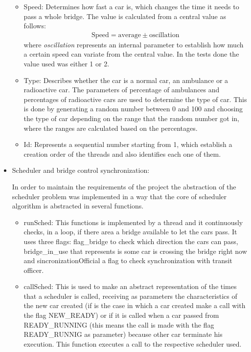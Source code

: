 \documentclass[a4paper,9pt]{article}
\begin{document}
\begin{itemize}
\begin{itemize}
\item Speed: Determines how fast a car is, which changes the time it needs to pass a whole bridge. The value is calculated from a central value as follows:
\begin{align}
\text{Speed} = \text{average} \pm \text{oscillation}
\end{align}
where \emph{oscillation} represents an internal parameter to establish how much a certain speed can variate from the central value. In the tests done the value used was either 1 or 2.

\item Type: Describes whether the car is a normal car, an ambulance or a radioactive car. The parameters of percentage of ambulances and percentages of radioactive cars are used to determine the type of car. This is done by generating a random number between 0 and 100 and choosing the type of car depending on the range that the random number got in, where the ranges are calculated based on the percentages.

\item Id: Represents a sequential number starting from 1, which establish a creation order of the threads and also identifies each one of them. 

\end{itemize}

\item Scheduler and bridge control synchronization: 

In order to maintain the requirements of the project the abstraction of the scheduler problem was implemented in a way that the core of scheduler algorithm is abstracted in several functions.
\begin{itemize}
\item runSched: This functions is implemented by a thread and it continuously checks, in a loop, if there area a bridge available to let the cars pass. It uses three flags: flag\_bridge to check which direction the cars can pass, bridge\_in\_use that represents is some car is crossing the bridge right now and sincronizationOfficial a flag to check synchronization with transit officer. 

\item callSched: 
This is used to make an abstract representation of the times that a scheduler is called, receiving as parameters the characteristics of the new car created (if is the case in which a car created make a call with the flag NEW\_READY) or if it is called when a car passed from READY\_RUNNING (this means the call is made with the flag READY\_RUNNIG as parameter) because other car terminate his execution. This function executes a call to the respective scheduler used. 


\end{itemize}
\end{itemize}
\end{document}
